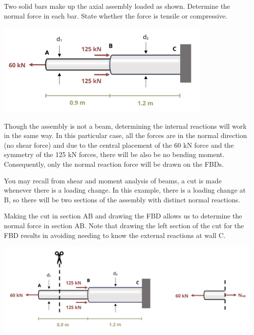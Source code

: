 \documentclass[
  letterpaper,
  DIV=11,
  numbers=noendperiod]{scrreprt}
\begin{document}
\begin{tcolorbox}[enhanced jigsaw, colback=white, colframe=quarto-callout-note-color-frame, leftrule=.75mm, opacitybacktitle=0.6, colbacktitle=quarto-callout-note-color!10!white, arc=.35mm, bottomrule=.15mm, breakable, title={Example 1.5}, left=2mm, titlerule=0mm, toptitle=1mm, toprule=.15mm, opacityback=0, rightrule=.15mm, coltitle=black, bottomtitle=1mm]

Two solid bars make up the axial assembly loaded as shown. Determine the
normal force in each bar. State whether the force is tensile or
compressive.

\begin{center}
\includegraphics[width=4.16667in,height=\textheight]{images/CH1 PNGs/example 1.5 part 1.png}
\end{center}

Though the assembly is not a beam, determining the internal reactions
will work in the same way. In this particular case, all the forces are
in the normal direction (no shear force) and due to the central
placement of the 60 kN force and the symmetry of the 125 kN forces,
there will be also be no bending moment. Consequently, only the normal
reaction force will be drawn on the FBDs.

You may recall from shear and moment analysis of beams, a cut is made
whenever there is a loading change. In this example, there is a loading
change at B, so there will be two sections of the assembly with distinct
normal reactions.

Making the cut in section AB and drawing the FBD allows us to determine
the normal force in section AB. Note that drawing the left section of
the cut for the FBD results in avoiding needing to know the external
reactions at wall C.

\begin{center}
\includegraphics{images/CH1 PNGs/example 1.5 part 2.png}
\end{center}


\end{tcolorbox}
\end{document}
